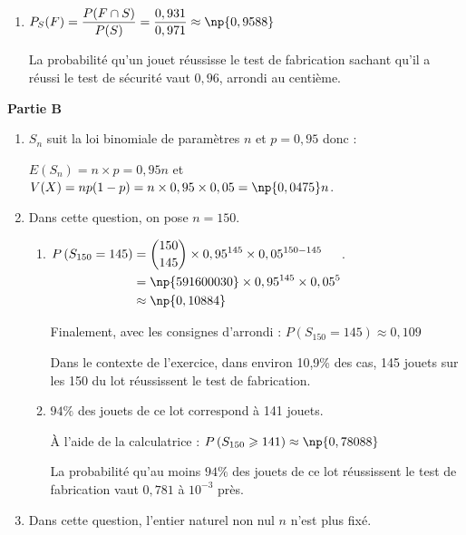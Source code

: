 \begin{enumerate}
On a donc : \quad $P(S)=0,931 + 0,05\times 0,8 = 0,971$.

La probabilité que le jouet réussisse le test de sécurité vaut, $0,97$ arrondi au centième.

	\item $P_{S}(F)= \dfrac{P(F\cap S)}{P(S)} = \dfrac{0,931}{0,971}\approx \np{0,9588}$

La probabilité qu'un jouet  réussisse le test de fabrication  sachant qu'il a réussi le test de sécurité vaut $0,96$, arrondi au centième.
\end{enumerate}

\medskip

\textbf{Partie B}

\medskip

\begin{enumerate}
	\item $S_{n}$ suit la loi binomiale de paramètres $n$ et $p = 0,95$ donc :

$E\left(S_n\right)=n\times p = 0,95n$ \quad et \quad $V(X)=np(1-p)= n \times 0,95 \times 0,05 = \np{0,0475}n$.

	\item Dans cette question, on pose $n = 150$.
	\begin{enumerate}
		\item
		$\begin{aligned}[t] P\left(S_{150}=145\right)
			& = \displaystyle \binom{150}{145}\times 0,95^{145}\times 0,05^{150 - 145}\\
			& = \np{591600030}\times 0,95^{145} \times 0,05^{5}\\
			& \approx \np{0,10884}
		\end{aligned}$.

Finalement, avec les consignes d'arrondi : \quad $P\left(S_{150}= 145\right) \approx 0,109$

Dans le contexte de l'exercice, dans environ 10,9\% des cas, 145 jouets sur les 150 du lot réussissent le test de fabrication.
		\item $94\%$ des jouets de ce lot  correspond à 141 jouets.

À l'aide de la calculatrice : $P\left(S_{150} \geqslant 141\right) \approx \np{0,78088}$

		La probabilité qu'au moins $94\%$ des jouets de ce lot réussissent le test de fabrication vaut $0,781$ à $10^{-3}$ près.
	\end{enumerate}

	\item Dans cette question, l'entier naturel non nul $n$ n'est plus fixé.


\end{enumerate}
